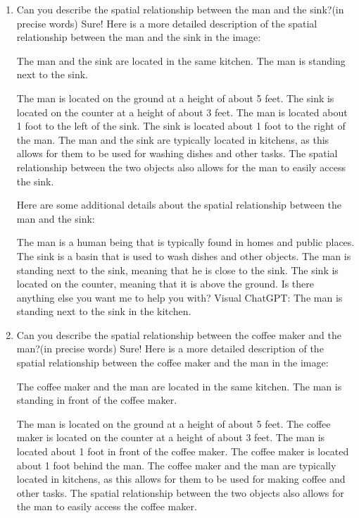 \begin{enumerate}
    \item Can you describe the spatial relationship between the man and the sink?(in precise words)
    \subitem Sure! Here is a more detailed description of the spatial relationship between the man and the sink in the image:

    The man and the sink are located in the same kitchen. The man is standing next to the sink.
    
    The man is located on the ground at a height of about 5 feet.
    The sink is located on the counter at a height of about 3 feet.
    The man is located about 1 foot to the left of the sink.
    The sink is located about 1 foot to the right of the man.
    The man and the sink are typically located in kitchens, as this allows for them to be used for washing dishes and other tasks. The spatial relationship between the two objects also allows for the man to easily access the sink.
    
    Here are some additional details about the spatial relationship between the man and the sink:
    
    The man is a human being that is typically found in homes and public places.
    The sink is a basin that is used to wash dishes and other objects.
    The man is standing next to the sink, meaning that he is close to the sink.
    The sink is located on the counter, meaning that it is above the ground.
    Is there anything else you want me to help you with?
    \subitem Visual ChatGPT: The man is standing next to the sink in the kitchen.
    \item Can you describe the spatial relationship between the coffee maker and the man?(in precise words)
    \subitem Sure! Here is a more detailed description of the spatial relationship between the coffee maker and the man in the image:

    The coffee maker and the man are located in the same kitchen. The man is standing in front of the coffee maker.
    
    The man is located on the ground at a height of about 5 feet.
    The coffee maker is located on the counter at a height of about 3 feet.
    The man is located about 1 foot in front of the coffee maker.
    The coffee maker is located about 1 foot behind the man.
    The coffee maker and the man are typically located in kitchens, as this allows for them to be used for making coffee and other tasks. The spatial relationship between the two objects also allows for the man to easily access the coffee maker.
    

\end{enumerate}
